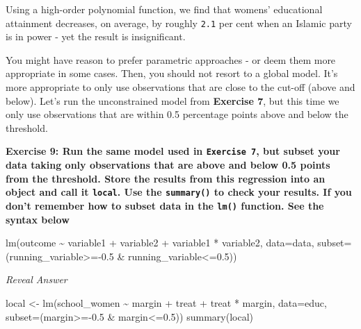 \documentclass[
  letterpaper,
  DIV=11,
  numbers=noendperiod]{scrreprt}
\newenvironment{Shaded}{\begin{snugshade}}{\end{snugshade}}
\newcommand{\AttributeTok}[1]{\textcolor[rgb]{0.40,0.45,0.13}{#1}}
\newcommand{\FloatTok}[1]{\textcolor[rgb]{0.68,0.00,0.00}{#1}}
\newcommand{\FunctionTok}[1]{\textcolor[rgb]{0.28,0.35,0.67}{#1}}
\newcommand{\NormalTok}[1]{\textcolor[rgb]{0.00,0.23,0.31}{#1}}
\newcommand{\OtherTok}[1]{\textcolor[rgb]{0.00,0.23,0.31}{#1}}
\newcommand{\SpecialCharTok}[1]{\textcolor[rgb]{0.37,0.37,0.37}{#1}}
\begin{document}
Using a high-order polynomial function, we find that womens' educational
attainment decreases, on average, by roughly \texttt{2.1} per cent when
an Islamic party is in power - yet the result is insignificant.

\hfill\break

You might have reason to prefer parametric approaches - or deem them
more appropriate in some cases. Then, you should not resort to a global
model. It's more appropriate to only use observations that are close to
the cut-off (above and below). Let's run the unconstrained model from
\textbf{Exercise 7}, but this time we only use observations that are
within 0.5 percentage points above and below the threshold.

\textbf{Exercise 9: Run the same model used in \texttt{Exercise\ 7}, but
subset your data taking only observations that are above and below 0.5
points from the threshold. Store the results from this regression into
an object and call it \texttt{local}. Use the \texttt{summary()} to
check your results. If you don't remember how to subset data in the
\texttt{lm()} function. See the syntax below}

\begin{Shaded}
\begin{Highlighting}[]
\FunctionTok{lm}\NormalTok{(outcome }\SpecialCharTok{\textasciitilde{}}\NormalTok{ variable1 }\SpecialCharTok{+}\NormalTok{ variable2 }\SpecialCharTok{+}\NormalTok{ variable1 }\SpecialCharTok{*}\NormalTok{ variable2, }\AttributeTok{data=}\NormalTok{data,}
           \AttributeTok{subset=}\NormalTok{(running\_variable}\SpecialCharTok{\textgreater{}={-}}\FloatTok{0.5} \SpecialCharTok{\&}\NormalTok{ running\_variable}\SpecialCharTok{\textless{}=}\FloatTok{0.5}\NormalTok{))}
\end{Highlighting}
\end{Shaded}

\hfill\break

\emph{Reveal Answer}

\begin{Shaded}
\begin{Highlighting}[]
\NormalTok{local }\OtherTok{\textless{}{-}} \FunctionTok{lm}\NormalTok{(school\_women }\SpecialCharTok{\textasciitilde{}}\NormalTok{ margin }\SpecialCharTok{+}\NormalTok{ treat }\SpecialCharTok{+}\NormalTok{ treat }\SpecialCharTok{*}\NormalTok{ margin, }\AttributeTok{data=}\NormalTok{educ,}
           \AttributeTok{subset=}\NormalTok{(margin}\SpecialCharTok{\textgreater{}={-}}\FloatTok{0.5} \SpecialCharTok{\&}\NormalTok{ margin}\SpecialCharTok{\textless{}=}\FloatTok{0.5}\NormalTok{))}
\FunctionTok{summary}\NormalTok{(local)}
\end{Highlighting}
\end{Shaded}
\end{document}
